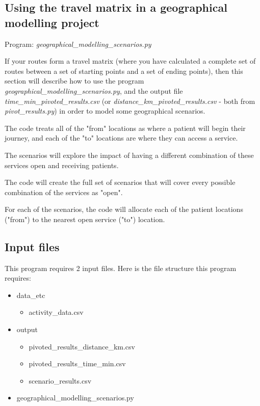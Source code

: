 \documentclass{article}
\begin{document}
\begin{flushleft}
\section{Using the travel matrix in a geographical modelling project}

Program: \textit{geographical\_modelling\_scenarios.py}\\

\vspace{\baselineskip}

If your routes form a travel matrix (where you have calculated a complete set of routes between a set of starting points and a set of ending points), then this section will describe how to use the program \textit{geographical\_modelling\_scenarios.py}, and the output file \textit{time\_min\_pivoted\_results.csv} (or \textit{distance\_km\_pivoted\_results.csv} - both from \textit{pivot\_results.py}) in order to model some geographical scenarios.

\vspace{\baselineskip}
The code treats all of the "from" locations as where a patient will begin their journey, and each of the "to" locations are where they can access a service.

The scenarios will explore the impact of having a different combination of these services open and receiving patients.

The code will create the full set of scenarios that will cover every possible combination of the services as "open".

\vspace{\baselineskip}

For each of the scenarios, the code will allocate each of the patient locations ("from") to the nearest open service ("to") location.

\subsection{Input files}

This program requires 2 input files. Here is the file structure this program requires:

\begin{itemize}
	\item data\_etc
	\begin{itemize}
		\item activity\_data.csv
	\end{itemize} 
	\item output
	\begin{itemize}
		\item pivoted\_results\_distance\_km.csv
		\item pivoted\_results\_time\_min.csv
		\item scenario\_results.csv
	\end{itemize} 
	\item geographical\_modelling\_scenarios.py
\end{itemize} 


\end{flushleft}
\end{document}
